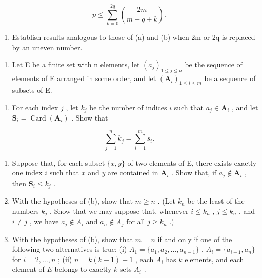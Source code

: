 \[
p \leqslant \sum_ {k = 0} ^ {2 q} \binom {2 m} {m - q + k}.
\]

\begin{enumerate}
\def\labelenumi{(\alph{enumi})}
\setcounter{enumi}{2}
\tightlist
\item
  Establish results analogous to those of (a) and (b) when 2m or 2q is replaced by an uneven number.
\end{enumerate}

\begin{enumerate}
\def\labelenumi{\arabic{enumi}.}
\setcounter{enumi}{13}
\tightlist
\item
  Let E be a finite set with n elements, let \((a_{j})_{1 \leqslant j \leqslant n}\) be the sequence of elements of E arranged in some order, and let \((\mathbf{A}_{i})_{1 \leqslant i \leqslant m}\) be a sequence of subsets of E.
\end{enumerate}

\begin{enumerate}
\def\labelenumi{(\alph{enumi})}
\tightlist
\item
  For each index \(j\) , let \(k_{j}\) be the number of indices \(i\) such that \(a_{j} \in \mathbf{A}_{i}\) , and let \(\mathbf{S}_{i} = \operatorname{Card}(\mathbf{A}_{i})\) . Show that
\end{enumerate}

\[
\sum_ {j = 1} ^ {n} k _ {j} = \sum_ {i = 1} ^ {m} s _ {i}.
\]

\begin{enumerate}
\def\labelenumi{(\alph{enumi})}
\setcounter{enumi}{1}
\item
  Suppose that, for each subset \(\{x, y\}\) of two elements of E, there exists exactly one index \(i\) such that \(x\) and \(y\) are contained in \(\mathbf{A}_i\) . Show that, if \(a_j \notin \mathbf{A}_i\) , then \(\mathbf{S}_i \leqslant k_j\) .
\item
  With the hypotheses of (b), show that \(m \geqslant n\) . (Let \(k_n\) be the least of the numbers \(k_j\) . Show that we may suppose that, whenever \(i \leqslant k_n\) , \(j \leqslant k_n\) , and \(i \neq j\) , we have \(a_j \notin A_i\) and \(a_n \notin A_j\) for all \(j \geqslant k_n\) .)
\item
  With the hypotheses of (b), show that \(m = n\) if and only if one of the following two alternatives is true: (i) \(A_1 = \{a_1, a_2, \ldots, a_{n-1}\}\) , \(A_i = \{a_{i-1}, a_n\}\) for \(i = 2, \ldots, n\) ; (ii) \(n = k(k - 1) + 1\) , each \(A_i\) has \(k\) elements, and each element of \(E\) belongs to exactly \(k\) sets \(A_i\) .
\end{enumerate}

